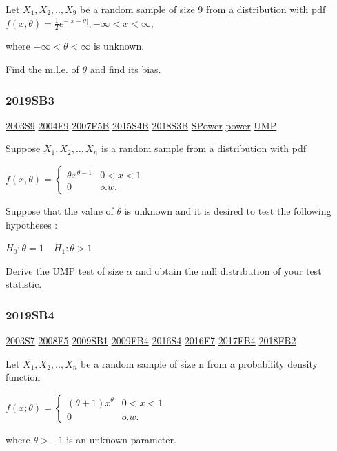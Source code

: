 \documentclass[6pt,Portrait]{article}
\begin{document}
Let \(X_1,X_2,..,X_9\) be a random sample of size 9 from a distribution
with pdf \(f(x,\theta) =\frac12e^{-|x-\theta|}, -\infty<x<\infty\);

where \(-\infty<\theta<\infty\) is unknown.

Find the m.l.e. of \(\theta\) and find its bias.

\hypertarget{sb3-3}{%
\subsubsection{2019SB3}\label{sb3-3}}

\protect\hyperlink{s9}{2003S9} \protect\hyperlink{f9-2}{2004F9}
\protect\hyperlink{f5b}{2007F5B} \protect\hyperlink{s4b-1}{2015S4B}
\protect\hyperlink{s3b-2}{2018S3B} \protect\hyperlink{SPower}{SPower}
\protect\hyperlink{power}{power} \protect\hyperlink{UMP}{UMP}

Suppose \(X_1,X_2,..,X_n\) is a random sample from a distribution with
pdf

\(f(x,\theta)=\begin{cases}\theta x^{\theta-1}& 0<x<1\\0& o.w.\end{cases}\)

Suppose that the value of \(\theta\) is unknown and it is desired to
test the following hypotheses :

\(H_0:\theta=1\quad H_1 :\theta>1\)

Derive the UMP test of size \(\alpha\) and obtain the null distribution
of your test statistic.

\hypertarget{sb4-2}{%
\subsubsection{2019SB4}\label{sb4-2}}

\protect\hyperlink{s7}{2003S7} \protect\hyperlink{f5-3}{2008F5}
\protect\hyperlink{sb1}{2009SB1} \protect\hyperlink{fb4}{2009FB4}
\protect\hyperlink{s4-4}{2016S4} \protect\hyperlink{f7-5}{2016F7}
\protect\hyperlink{fb4-3}{2017FB4} \protect\hyperlink{fb2-4}{2018FB2}

Let \(X_1,X_2,..,X_n\) be a random sample of size n from a probability
density function

\(f(x;\theta)=\begin{cases}(\theta+1)x^\theta& 0<x<1\\0& o.w.\end{cases}\)

where \(\theta>-1\) is an unknown parameter.
\end{document}
